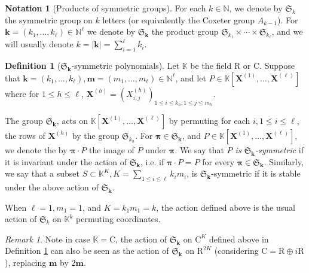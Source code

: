 \documentclass{amsart}
\theoremstyle{definition}
\newtheorem{definition}{Definition}
\newtheorem{notation}{Notation}
\theoremstyle{remark}
\newtheorem{remark}{Remark}
\numberwithin{equation}{section}
\begin{document}
\begin{notation}[Products of symmetric groups]
\label{not:symmetric-group}
For each $k \in {\mathbb{N}}$, we denote by $\mathfrak{S}_k$ the symmetric group on $k$ letters (or equivalently the Coxeter group $A_{k-1}$).
For ${\mathbf{k}}=(k_1,\ldots,k_\ell) \in {\mathbb{N}}^\ell$ we denote by $\mathfrak{S}_{\mathbf{k}}$ the product group 
$\mathfrak{S}_{k_1} \times \cdots \times \mathfrak{S}_{k_\ell}$, and we will
usually denote $k = |{\mathbf{k}}| = \sum_{i=1}^{\ell} k_i$.
\end{notation}

\begin{definition}[$\mathfrak{S}_{\mathbf{k}}$-symmetric polynomials]
\label{def:action}
Let ${\mathbb{K}}$ be the field ${\mathrm{R}}$ or ${\mathrm{C}}$.
Suppose that ${\mathbf{k}}=(k_1,\ldots,k_\ell), {\mathbf{m}} =(m_1,\ldots,m_\ell) \in {\mathbb{N}}^\ell$, and let 
$P \in {\mathbb{K}}[{\mathbf{X}}^{(1)},\ldots,{\mathbf{X}}^{(\ell)}]$
where for $1 \leq h \leq \ell$, 
${\mathbf{X}}^{(h)} = \left(X^{(h)}_{i,j}\right)_{1\leq i \leq k_h, 1\leq j \leq m_h}$.

The group $\mathfrak{S}_{\mathbf{k}}$, acts on ${\mathbb{K}}[{\mathbf{X}}^{(1)},\ldots,{\mathbf{X}}^{(\ell)}]$
by permuting for each $i,1\leq i \leq \ell$, 
the rows of ${\mathbf{X}}^{(h)}$ by the group $\mathfrak{S}_{k_h}$. For $\pmb{\pi} \in \mathfrak{S}_{\mathbf{k}}$,
and $P \in {\mathbb{K}}[{\mathbf{X}}^{(1)},\ldots,{\mathbf{X}}^{(\ell)}]$, we denote the by $\pmb{\pi}\cdot P$ the image of
$P$ under $\pmb{\pi}$. 
We say that \emph{$P$ is $\mathfrak{S}_{\mathbf{k}}$-symmetric} if it is invariant under the action of 
$\mathfrak{S}_{\mathbf{k}}$, i.e. if $\pmb{\pi}\cdot P = P$ for every $\pmb{\pi} \in \mathfrak{S}_{\mathbf{k}}$.
{}
Similarly, we say that a 
subset $S \subset {\mathbb{K}}^K, K = \sum_{1\leq i \leq \ell} k_i m_i$,
is $\mathfrak{S}_{\mathbf{k}}$-symmetric if it is stable under the above action of $\mathfrak{S}_{\mathbf{k}}$. 

When $\ell=1,m_1=1$, and $K= k_1m_1 = k$, the action defined above is the usual action of $\mathfrak{S}_k$ on ${\mathbb{K}}^k$
permuting coordinates. 
\end{definition}

\begin{remark}
\label{rem:complex-action}
Note in case ${\mathbb{K}} = {\mathrm{C}}$, the action of $\mathfrak{S}_{\mathbf{k}}$ on ${\mathrm{C}}^K$ defined above in Definition
\ref{def:action}  can also be seen as the action of $\mathfrak{S}_{\mathbf{k}}$ on ${\mathrm{R}}^{2 K}$ (considering ${\mathrm{C}} = {\mathrm{R}} \oplus  i{\mathrm{R}}$), replacing ${\mathbf{m}}$ by $2{\mathbf{m}}$.
{}
\end{remark}
\end{document}
